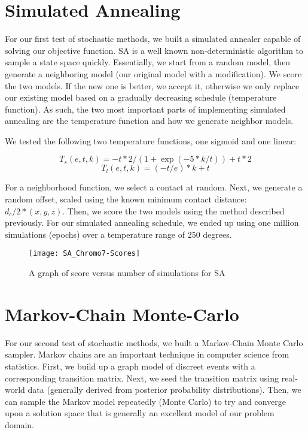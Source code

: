 \documentclass{article}
\begin{document}
\section{Simulated Annealing}

For our first test of stochastic methods, we built a simulated annealer capable of solving our objective function.  SA is a well known non-deterministic algorithm to sample a state space quickly.  Essentially, we start from a random model, then generate a neighboring model (our original model with a modification).  We score the two models.  If the new one is better, we accept it, otherwise we only replace our existing model based on a gradually decreasing schedule (temperature function).  As such, the two most important parts of implementing simulated annealing are the temperature function and how we generate neighbor models.

We tested the following two temperature functions, one sigmoid and one linear:

\begin{equation}
      T_s(e,t,k) =  -t*2/(1 + \exp(-5*k/t)) + t*2
    \end{equation}
\begin{equation}
      T_l(e,t,k) =  (-t/e)*k + t
    \end{equation}
    
For a neighborhood function, we select a contact at random.  Next, we generate a random offset, scaled using the known minimum contact distance: $d_{c}/2*(x,y,z)$.  Then, we score the two models using the method described previously.  For our simulated annealing schedule, we ended up using one million simulations (epochs) over a temperature range of 250 degrees.

\begin{figure}[H]
\begin{center}
\texttt{[image: SA\_Chromo7-Scores]}
\caption{A graph of score versus number of simulations for SA}
\label{Fig:sa_score}
\end{center}
\end{figure}

\section{Markov-Chain Monte-Carlo}

For our second test of stochastic methods, we built a Markov-Chain Monte Carlo sampler.  Markov chains are an important technique in computer science from statistics.  First, we build up a graph model of discreet events with a corresponding transition matrix.  Next, we seed the transition matrix using real-world data (generally derived from posterior probability distributions).  Then, we can sample the Markov model repeatedly (Monte Carlo) to try and converge upon a solution space that is generally an excellent model of our problem domain.
\end{document}
